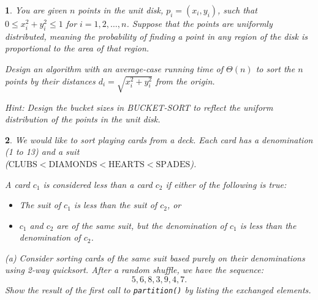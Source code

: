 \documentclass[%
addpoints]{exam}
\theoremstyle{problem}
\newtheorem{p}{}
\begin{document}
\begin{p}
You are given \( n \) points in the unit disk, \( p_i = (x_i, y_i) \), such that \( 0 \leq x_i^2 + y_i^2 \leq 1 \) for \( i = 1, 2, \dots, n \). Suppose that the points are uniformly distributed, meaning the probability of finding a point in any region of the disk is proportional to the area of that region.  

Design an algorithm with an average-case running time of \( \Theta(n) \) to sort the \( n \) points by their distances \( d_i = \sqrt{x_i^2 + y_i^2} \) from the origin.  

Hint: Design the bucket sizes in BUCKET-SORT to reflect the uniform distribution of the points in the unit disk.  
\hfill\end{p}

\begin{p}
We would like to sort playing cards from a deck. Each card has a denomination (1 to 13) and a suit\\ (\(\text{CLUBS} < \text{DIAMONDS} < \text{HEARTS} < \text{SPADES}\)).  

A card \( c_1 \) is considered less than a card \( c_2 \) if either of the following is true:
\begin{itemize}
    \item The suit of \( c_1 \) is less than the suit of \( c_2 \), or
    \item \( c_1 \) and \( c_2 \) are of the same suit, but the denomination of \( c_1 \) is less than the denomination of \( c_2 \).
\end{itemize}

(a) Consider sorting cards of the same suit based purely on their denominations using 2-way quicksort. After a random shuffle, we have the sequence:  
\[ 5, 6, 8, 3, 9, 4, 7. \]  
Show the result of the first call to \texttt{partition()} by listing the exchanged elements.  
\hfill\end{p}

\newpage
\end{document}
